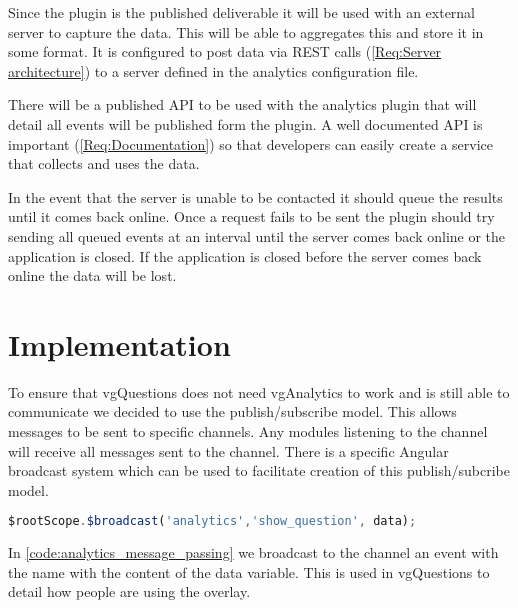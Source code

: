 Since the plugin is the published deliverable it will be used with an external server to capture the data. This will be able to aggregates this and store it in some format. It is configured to post data via \gls{REST} calls (\cref{Req:Server architecture}) to a server defined in the analytics configuration file.

There will be a published \gls{API} to be used with the analytics plugin that will detail all events will be published form the plugin. A well documented API is important (\cref{Req:Documentation}) so that developers can easily create a service that collects and uses the data.

In the event that the server is unable to be contacted it should queue the results until it comes back online. Once a request fails to be sent the plugin should try sending all queued events at an interval until the server comes back online or the application is closed. If the application is closed before the server comes back online the data will be lost.

\section{Implementation}

To ensure that vgQuestions does not need vgAnalytics to work and is still able to communicate we decided to use the publish/subscribe model. This allows messages to be sent to specific channels. Any modules listening to the channel will receive all messages sent to the channel. There is a specific Angular broadcast system which can be used to facilitate creation of this publish/subcribe model.

\begin{lstlisting}[language=javascript,caption={AngularJS demonstrating the message passing interface used in the Analytics plugin},label={code:analytics_message_passing}]
$rootScope.$broadcast('analytics','show_question', data);
\end{lstlisting}

In \autoref{code:analytics_message_passing} we broadcast to the  channel an event with the name
 with the content of the data variable. This is used in \gls{vgQuestions} to detail how people are using the overlay.

